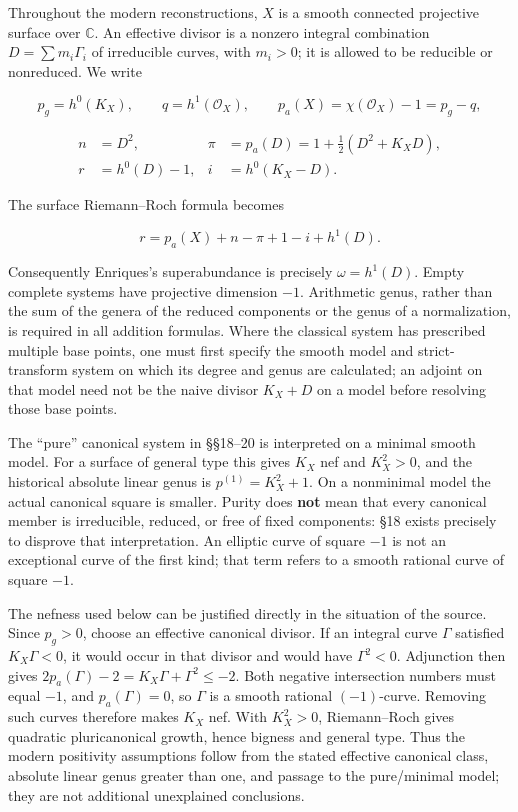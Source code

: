 Throughout the modern reconstructions, \(X\) is a smooth connected projective surface over \(\mathbb C\). An effective divisor is a nonzero integral combination \(D=\sum m_i\Gamma_i\) of irreducible curves, with \(m_i>0\); it is allowed to be reducible or nonreduced. We write

\[
p_g=h^0(K_X),\qquad q=h^1(\mathcal O_X),\qquad
p_a(X)=\chi(\mathcal O_X)-1=p_g-q,
\]

\[
\begin{aligned}
n&=D^2, &\pi&=p_a(D)=1+\tfrac12(D^2+K_X D),\\
r&=h^0(D)-1, &i&=h^0(K_X-D).
\end{aligned}
\]

The surface Riemann--Roch formula becomes

\[
r=p_a(X)+n-\pi+1-i+h^1(D).
\tag{IV.15.1}
\]

Consequently Enriques's superabundance is precisely \(\omega=h^1(D)\). Empty complete systems have projective dimension \(-1\). Arithmetic genus, rather than the sum of the genera of the reduced components or the genus of a normalization, is required in all addition formulas. Where the classical system has prescribed multiple base points, one must first specify the smooth model and strict-transform system on which its degree and genus are calculated; an adjoint on that model need not be the naive divisor \(K_X+D\) on a model before resolving those base points.

The ``pure'' canonical system in §§18--20 is interpreted on a minimal smooth model. For a surface of general type this gives \(K_X\) nef and \(K_X^2>0\), and the historical absolute linear genus is \(p^{(1)}=K_X^2+1\). On a nonminimal model the actual canonical square is smaller. Purity does \textbf{not} mean that every canonical member is irreducible, reduced, or free of fixed components: §18 exists precisely to disprove that interpretation. An elliptic curve of square \(-1\) is not an exceptional curve of the first kind; that term refers to a smooth rational curve of square \(-1\).

The nefness used below can be justified directly in the situation of the source. Since \(p_g>0\), choose an effective canonical divisor. If an integral curve \(\Gamma\) satisfied \(K_X\Gamma<0\), it would occur in that divisor and would have \(\Gamma^2<0\). Adjunction then gives \(2p_a(\Gamma)-2=K_X\Gamma+\Gamma^2\le-2\). Both negative intersection numbers must equal \(-1\), and \(p_a(\Gamma)=0\), so \(\Gamma\) is a smooth rational \((-1)\)-curve. Removing such curves therefore makes \(K_X\) nef. With \(K_X^2>0\), Riemann--Roch gives quadratic pluricanonical growth, hence bigness and general type. Thus the modern positivity assumptions follow from the stated effective canonical class, absolute linear genus greater than one, and passage to the pure/minimal model; they are not additional unexplained conclusions.

